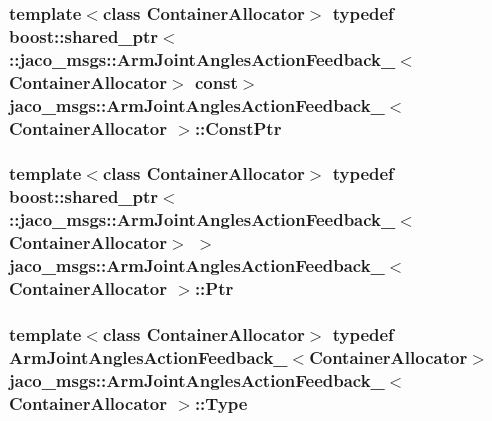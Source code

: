 \subsubsection[{\texorpdfstring{Const\+Ptr}{ConstPtr}}]{\setlength{\rightskip}{0pt plus 5cm}template$<$class Container\+Allocator$>$ typedef boost\+::shared\+\_\+ptr$<$ \+::{\bf jaco\+\_\+msgs\+::\+Arm\+Joint\+Angles\+Action\+Feedback\+\_\+}$<$Container\+Allocator$>$ const$>$ {\bf jaco\+\_\+msgs\+::\+Arm\+Joint\+Angles\+Action\+Feedback\+\_\+}$<$ Container\+Allocator $>$\+::{\bf Const\+Ptr}}\hypertarget{structjaco__msgs_1_1ArmJointAnglesActionFeedback___a695a4ffab62a086481b14d1f08475d06}{}\label{structjaco__msgs_1_1ArmJointAnglesActionFeedback___a695a4ffab62a086481b14d1f08475d06}
\subsubsection[{\texorpdfstring{Ptr}{Ptr}}]{\setlength{\rightskip}{0pt plus 5cm}template$<$class Container\+Allocator$>$ typedef boost\+::shared\+\_\+ptr$<$ \+::{\bf jaco\+\_\+msgs\+::\+Arm\+Joint\+Angles\+Action\+Feedback\+\_\+}$<$Container\+Allocator$>$ $>$ {\bf jaco\+\_\+msgs\+::\+Arm\+Joint\+Angles\+Action\+Feedback\+\_\+}$<$ Container\+Allocator $>$\+::{\bf Ptr}}\hypertarget{structjaco__msgs_1_1ArmJointAnglesActionFeedback___aee3a600e716f11e9662b2ef982c271a6}{}\label{structjaco__msgs_1_1ArmJointAnglesActionFeedback___aee3a600e716f11e9662b2ef982c271a6}
\subsubsection[{\texorpdfstring{Type}{Type}}]{\setlength{\rightskip}{0pt plus 5cm}template$<$class Container\+Allocator$>$ typedef {\bf Arm\+Joint\+Angles\+Action\+Feedback\+\_\+}$<$Container\+Allocator$>$ {\bf jaco\+\_\+msgs\+::\+Arm\+Joint\+Angles\+Action\+Feedback\+\_\+}$<$ Container\+Allocator $>$\+::{\bf Type}}\hypertarget{structjaco__msgs_1_1ArmJointAnglesActionFeedback___af4ed900d239fe058855459eb150e621f}{}\label{structjaco__msgs_1_1ArmJointAnglesActionFeedback___af4ed900d239fe058855459eb150e621f}


